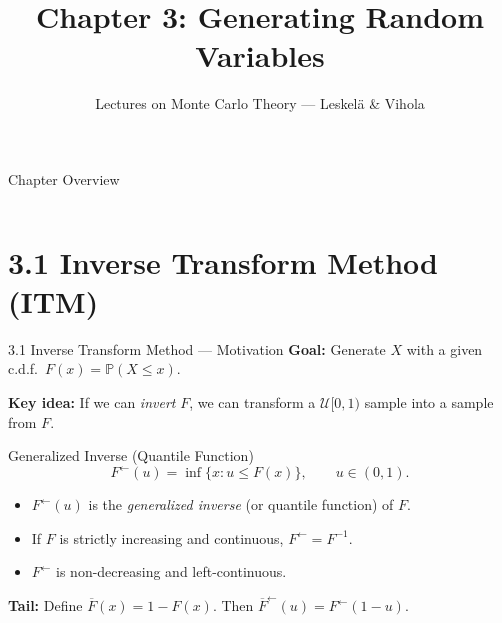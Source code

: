 \documentclass[aspectratio=169,10pt]{beamer}
\title[Ch.\,3: Generating Random Variables]{%
  Chapter 3: Generating Random Variables}
\subtitle{Lectures on Monte Carlo Theory --- Leskel\"a \& Vihola}
\author{}
\date{}
\newcommand{\PP}{\mathbb{P}}
\newcommand{\UU}{\mathcal{U}}
\newcommand{\FInv}{F^{\leftarrow}}
\begin{document}
\begin{frame}
  \titlepage
\end{frame}

\begin{frame}{Chapter Overview}
  \begin{columns}[t]
    \tableofcontents[sections={1-5}]
    \tableofcontents[sections={6-12}]
  \end{columns}
\end{frame}


\section{3.1 Inverse Transform Method (ITM)}

\begin{frame}{3.1 Inverse Transform Method --- Motivation}
  \textbf{Goal:} Generate $X$ with a given c.d.f.\ $F(x)=\PP(X\le x)$.

  \medskip
  \textbf{Key idea:} If we can \emph{invert} $F$, we can transform a
  $\UU[0,1)$ sample into a sample from $F$.

  \medskip
  \begin{block}{Generalized Inverse (Quantile Function)}
    \[
      \FInv(u) = \inf\{x : u \le F(x)\}, \qquad u\in(0,1).
    \]
    \begin{itemize}
      \item $\FInv(u)$ is the \emph{generalized inverse} (or quantile function) of $F$.
      \item If $F$ is strictly increasing and continuous, $\FInv = F^{-1}$.
      \item $\FInv$ is non-decreasing and left-continuous.
    \end{itemize}
  \end{block}

  \medskip
  \textbf{Tail:} Define $\overline{F}(x)=1-F(x)$.  Then
  $\overline{F}^{\leftarrow}(u)=\FInv(1-u)$.
\end{frame}
\end{document}
